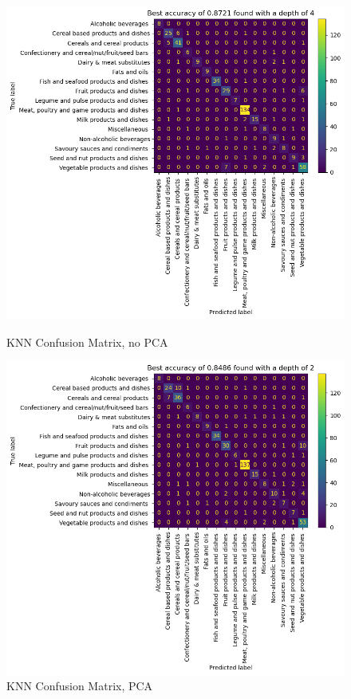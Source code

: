 \documentclass[12pt,a4paper]{article}
\begin{document}
    \begin{figure}[h]
        \centering
        \begin{minipage}{0.5\textwidth}
            \centering
            \includegraphics[width=\textwidth]{knn-conf-nopca} %
            \caption{KNN Confusion Matrix, no PCA}
            \label{fig:knn-conf-nopca}
        \end{minipage}\hfill
        \begin{minipage}{0.5\textwidth}
            \centering
            \includegraphics[width=\textwidth]{knn-conf-pca} %
            \caption{KNN Confusion Matrix, PCA}
            \label{fig:knn-conf-pca}
        \end{minipage}
    \end{figure}
\end{document}
